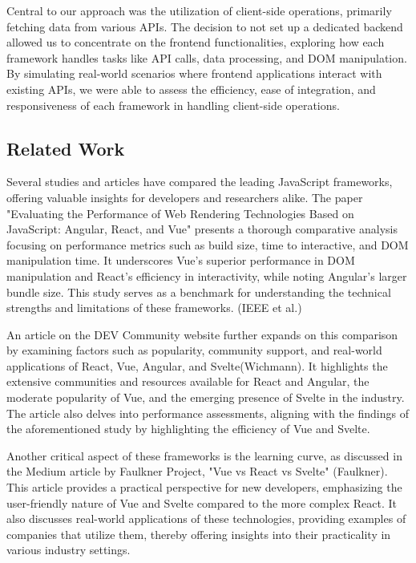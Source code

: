Central to our approach was the utilization of client-side operations, primarily fetching data from various APIs. The decision to not set up a dedicated backend allowed us to concentrate on the frontend functionalities, exploring how each framework handles tasks like API calls, data processing, and DOM manipulation. By simulating real-world scenarios where frontend applications interact with existing APIs, we were able to assess the efficiency, ease of integration, and responsiveness of each framework in handling client-side operations.

\subsection{Related Work}

Several studies and articles have compared the leading JavaScript frameworks, offering valuable insights for developers and researchers alike. The paper "Evaluating the Performance of Web Rendering Technologies Based on JavaScript: Angular, React, and Vue" presents a thorough comparative analysis focusing on performance metrics such as build size, time to interactive, and DOM manipulation time. It underscores Vue's superior performance in DOM manipulation and React's efficiency in interactivity, while noting Angular's larger bundle size. This study serves as a benchmark for understanding the technical strengths and limitations of these frameworks. (IEEE et al.)

An article on the DEV Community website further expands on this comparison by examining factors such as popularity, community support, and real-world applications of React, Vue, Angular, and Svelte​​ (Wichmann). It highlights the extensive communities and resources available for React and Angular, the moderate popularity of Vue, and the emerging presence of Svelte in the industry. The article also delves into performance assessments, aligning with the findings of the aforementioned study by highlighting the efficiency of Vue and Svelte​​​​.

Another critical aspect of these frameworks is the learning curve, as discussed in the Medium article by Faulkner Project, "Vue vs React vs Svelte" (Faulkner)​​. This article provides a practical perspective for new developers, emphasizing the user-friendly nature of Vue and Svelte compared to the more complex React. It also discusses real-world applications of these technologies, providing examples of companies that utilize them, thereby offering insights into their practicality in various industry settings​​​​​​.

